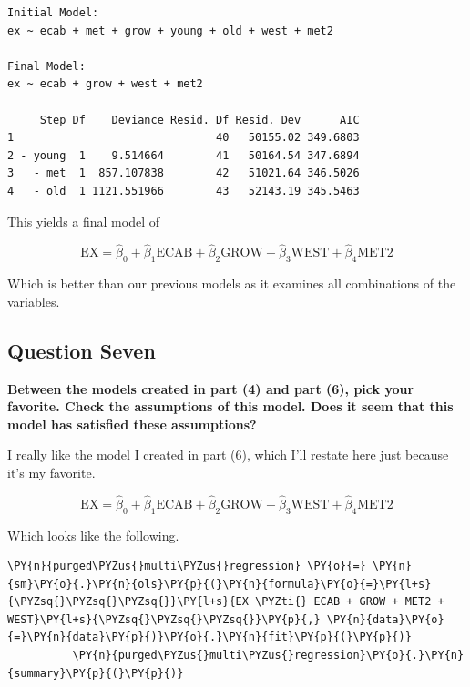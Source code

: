 \documentclass[10pt]{article}\usepackage[]{graphicx}\usepackage[]{xcolor}
\begin{document}
    
    \begin{verbatim}
Initial Model:
ex ~ ecab + met + grow + young + old + west + met2

Final Model:
ex ~ ecab + grow + west + met2

     Step Df    Deviance Resid. Df Resid. Dev      AIC
1                               40   50155.02 349.6803
2 - young  1    9.514664        41   50164.54 347.6894
3   - met  1  857.107838        42   51021.64 346.5026
4   - old  1 1121.551966        43   52143.19 345.5463

    \end{verbatim}

    
    This yields a final model of

\begin{equation}
    \text{EX} = \hat{\beta}_0 +
                \hat{\beta}_1 \text{ECAB} +
                \hat{\beta}_2 \text{GROW} +
                \hat{\beta}_3 \text{WEST} +
                \hat{\beta}_4 \text{MET2}
\end{equation}

Which is better than our previous models as it examines all combinations
of the variables.

\subsection*{Question Seven}
    \textbf{Between the models created in part (4) and part (6), pick your favorite. Check the assumptions of this
    model. Does it seem that this model has satisfied these assumptions?}\newline

    I really like the model I created in part (6), which I'll restate here
just because it's my favorite.

\begin{equation}
    \text{EX} = \hat{\beta}_0 +
                \hat{\beta}_1 \text{ECAB} +
                \hat{\beta}_2 \text{GROW} +
                \hat{\beta}_3 \text{WEST} +
                \hat{\beta}_4 \text{MET2}
\end{equation}

Which looks like the following.

    \begin{Verbatim}[commandchars=\\\{\}]
 \PY{n}{purged\PYZus{}multi\PYZus{}regression} \PY{o}{=} \PY{n}{sm}\PY{o}{.}\PY{n}{ols}\PY{p}{(}\PY{n}{formula}\PY{o}{=}\PY{l+s}{\PYZsq{}\PYZsq{}\PYZsq{}}\PY{l+s}{EX \PYZti{} ECAB + GROW + MET2 + WEST}\PY{l+s}{\PYZsq{}\PYZsq{}\PYZsq{}}\PY{p}{,} \PY{n}{data}\PY{o}{=}\PY{n}{data}\PY{p}{)}\PY{o}{.}\PY{n}{fit}\PY{p}{(}\PY{p}{)}
          \PY{n}{purged\PYZus{}multi\PYZus{}regression}\PY{o}{.}\PY{n}{summary}\PY{p}{(}\PY{p}{)}
\end{Verbatim}
\end{document}
